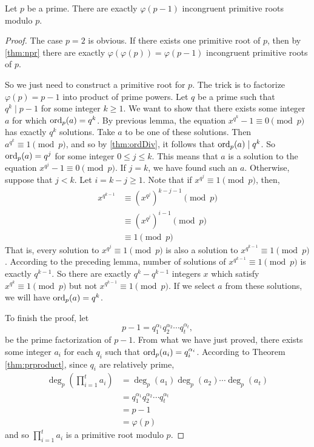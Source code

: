 \begin{theorem}\label{thm:primeprimitive}
	Let $p$ be a prime. There are exactly $\varphi(p-1)$ incongruent primitive roots modulo $p$.
\end{theorem}

\begin{proof}
	The case $p=2$ is obvious. If there exists one primitive root of $p$, then by \autoref{thm:npr} there are exactly $\varphi(\varphi(p))=\varphi(p-1)$ incongruent primitive roots of $p$.

	So we just need to construct a primitive root for $p$. The trick is to factorize $\varphi(p)=p-1$ into product of prime powers. Let $q$ be a prime such that $q^k \mid p-1$ for some integer $k \geq 1$. We want to show that there exists some integer $a$ for which $\operatorname{ord}_p(a)=q^k$. By previous lemma, the equation $x^{q^k} - 1 \equiv 0 \pmod p$ has exactly $q^k$ solutions. Take $a$ to be one of these solutions. Then $a^{q^k} \equiv 1 \pmod p$, and so by \autoref{thm:ordDiv}, it follows that $\operatorname{ord}_p(a)\mid q^k$. So $\operatorname{ord}_p(a)=q^j$ for some integer $0 \leq j \leq k$. This means that $a$ is a solution to the equation $x^{q^j} - 1 \equiv 0 \pmod p$. If $j=k$, we have found such an $a$. Otherwise, suppose that $j<k$. Let $i=k-j\geq 1$. Note that if $x^{q^j} \equiv 1 \pmod p$, then,
		\begin{align*}
			x^{q^{k-1}}
				& \equiv \left(x^{q^j}\right)^{k-j-1}\pmod{p}\\
				& \equiv \left(x^{q^j}\right)^{i-1}\pmod{p}\\
				& \equiv 1 \pmod p
		\end{align*}
	That is, every solution to $x^{q^j} \equiv 1 \pmod p$ is also a solution to $x^{q^{k-1}} \equiv 1 \pmod p$. According to the preceding lemma, number of solutions of $x^{q^{k-1}} \equiv 1 \pmod p$ is exactly $q^{k-1}$. So there are exactly $q^k - q^{k-1}$ integers $x$ which satisfy $x^{q^k} \equiv 1 \pmod p$ but not $x^{q^{k-1}} \equiv 1 \pmod p$. If we select $a$ from these solutions, we will have $\operatorname{ord}_p(a)=q^k$.

	To finish the proof, let $$p-1 = q_1^{\alpha_1}q_2^{\alpha_2} \cdots q_t^{\alpha_t},$$ be the prime factorization of $p-1$. From what we have just proved, there exists some integer $a_i$ for each $q_i$ such that $\operatorname{ord}_p(a_i)=q_i^{\alpha_i}$. According to Theorem \eqref{thm:prproduct}, since $q_i$ are relatively prime,
		\begin{align*}
			\deg_p\left(\prod_{i=1}^{t}a_i\right)
				& = \deg_p(a_1) \deg_p(a_2) \cdots \deg_p(a_t)\\
				& = q_1^{\alpha_1}q_2^{\alpha_2} \cdots q_t^{\alpha_t}\\
				& = p-1\\
				& =\varphi(p)
		\end{align*}
	and so $\prod_{i=1}^{t}a_i$ is a primitive root modulo $p$.
\end{proof}

